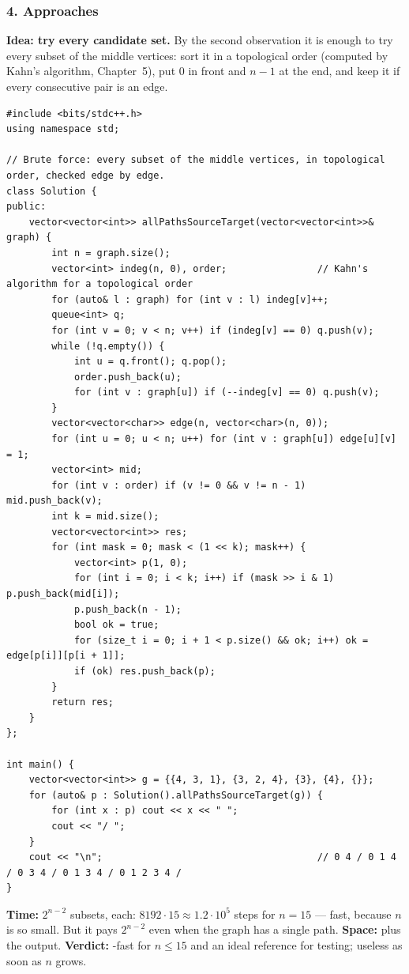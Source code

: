 \subsubsection*{4. Approaches}

\begin{bruteforcebox}
\textbf{Idea: try every candidate set.} By the second observation it is enough to try every subset of the middle vertices: sort it in a topological order (computed by Kahn's algorithm, Chapter~5), put 0 in front and $n-1$ at the end, and keep it if every consecutive pair is an edge.

\begin{lstlisting}[style=cpp]
#include <bits/stdc++.h>
using namespace std;

// Brute force: every subset of the middle vertices, in topological order, checked edge by edge.
class Solution {
public:
    vector<vector<int>> allPathsSourceTarget(vector<vector<int>>& graph) {
        int n = graph.size();
        vector<int> indeg(n, 0), order;                // Kahn's algorithm for a topological order
        for (auto& l : graph) for (int v : l) indeg[v]++;
        queue<int> q;
        for (int v = 0; v < n; v++) if (indeg[v] == 0) q.push(v);
        while (!q.empty()) {
            int u = q.front(); q.pop();
            order.push_back(u);
            for (int v : graph[u]) if (--indeg[v] == 0) q.push(v);
        }
        vector<vector<char>> edge(n, vector<char>(n, 0));
        for (int u = 0; u < n; u++) for (int v : graph[u]) edge[u][v] = 1;
        vector<int> mid;
        for (int v : order) if (v != 0 && v != n - 1) mid.push_back(v);
        int k = mid.size();
        vector<vector<int>> res;
        for (int mask = 0; mask < (1 << k); mask++) {
            vector<int> p(1, 0);
            for (int i = 0; i < k; i++) if (mask >> i & 1) p.push_back(mid[i]);
            p.push_back(n - 1);
            bool ok = true;
            for (size_t i = 0; i + 1 < p.size() && ok; i++) ok = edge[p[i]][p[i + 1]];
            if (ok) res.push_back(p);
        }
        return res;
    }
};

int main() {
    vector<vector<int>> g = {{4, 3, 1}, {3, 2, 4}, {3}, {4}, {}};
    for (auto& p : Solution().allPathsSourceTarget(g)) {
        for (int x : p) cout << x << " ";
        cout << "/ ";
    }
    cout << "\n";                                      // 0 4 / 0 1 4 / 0 3 4 / 0 1 3 4 / 0 1 2 3 4 /
}
\end{lstlisting}

\begin{complexitybox}
\textbf{Time:} $2^{n-2}$ subsets,  each: $8192 \cdot 15 \approx 1.2 \cdot 10^5$ steps for $n = 15$ --- fast, because $n$ is so small. But it pays $2^{n-2}$ even when the graph has a single path. \textbf{Space:}  plus the output. \textbf{Verdict:} \ac{}-fast for $n \le 15$ and an ideal reference for testing; useless as soon as $n$ grows.
\end{complexitybox}
\end{bruteforcebox}

